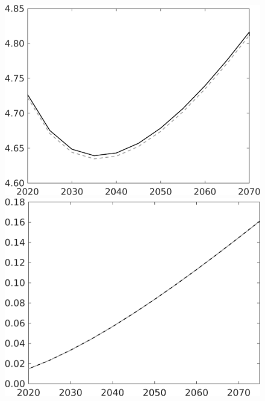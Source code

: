 \documentclass[12pt]{article}
\begin{document}
\begin{figure}[h!!]
\begin{minipage}[]{0.32\textwidth}
	\end{minipage}	
	\begin{minipage}[]{0.32\textwidth}
		\includegraphics[width=1\textwidth]{../../codding_model/own_basedOnFried/optimalPol_010922_revision/figures/all_13Sept22/CompTaul_Equlab_LFBAU_Reg0_gAf_spillover0_nsk0_xgr0_knspil0_sep1_countec0_GovRev0_etaa0.79_lgd0.png}
	\end{minipage}	
	\begin{minipage}[]{0.32\textwidth}
		\includegraphics[width=1\textwidth]{../../codding_model/own_basedOnFried/optimalPol_010922_revision/figures/all_13Sept22/CompTaul_Equlab_LFBAU_Reg0_AgAf_spillover0_nsk0_xgr0_knspil0_sep1_countec0_GovRev0_etaa0.79_lgd0.png}

\end{minipage}
\end{figure}
\end{document}
